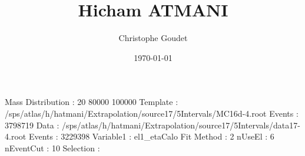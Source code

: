 \documentclass[a4paper,12pt]{article}
\title{Hicham ATMANI}
\author{Christophe Goudet}
\date{\today}
\begin{document}
\maketitle
Mass Distribution : 20 80000 100000\newline
Template : /sps/atlas/h/hatmani/Extrapolation/source17/5Intervals/MC16d-4.root\newline
Events : 3798719\newline
Data : /sps/atlas/h/hatmani/Extrapolation/source17/5Intervals/data17-4.root\newline
Events : 3229398\newline
Variable1 : el1\_etaCalo \newline
Fit Method : 2\newline
nUseEl : 6\newline
nEventCut : 10\newline
Selection : \newline
\tableofcontents\clearpage
\end{document}
